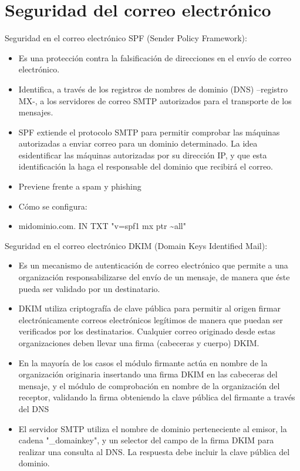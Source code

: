 \documentclass[aspectratio=169,11pt]{beamer}
\begin{document}
\section{Seguridad del correo electrónico}

\begin{frame}[allowframebreaks]{Seguridad en el correo electrónico}
\small
SPF (Sender Policy Framework):
  \begin{itemize}
  \item Es una protección contra la falsificación de direcciones en el envío de correo electrónico.
  \item Identifica, a través de los registros de nombres de dominio (DNS) --registro MX-, a los servidores de correo SMTP autorizados para el transporte de los mensajes.
  \item SPF extiende el protocolo SMTP para permitir comprobar las máquinas autorizadas a enviar correo para un dominio determinado. La idea esidentificar las máquinas autorizadas por su dirección IP, y que esta identificación la haga el responsable del dominio que recibirá el correo.
  \item Previene frente a spam y phishing
  \item Cómo se configura:
  \item midominio.com. IN TXT "v=spf1 mx ptr \textasciitilde{}all"
  \end{itemize}
\end{frame}

\begin{frame}{Seguridad en el correo electrónico}
\footnotesize
DKIM (Domain Keys Identified Mail):
  \begin{itemize}
  \item Es un mecanismo de autenticación de correo electrónico que permite a una organización responsabilizarse del envío de un mensaje, de manera que éste pueda ser validado por un destinatario.
  \item DKIM utiliza criptografía de clave pública para permitir al origen firmar electrónicamente correos electrónicos legítimos de manera que puedan ser verificados por los destinatarios. Cualquier correo originado desde estas organizaciones deben llevar una firma (cabeceras y cuerpo) DKIM.
  \item En la mayoría de los casos el módulo firmante actúa en nombre de la organización originaria insertando una firma DKIM en las cabeceras del mensaje, y el módulo de comprobación en nombre de la organización del receptor, validando la firma obteniendo la clave pública del firmante a través del DNS
  \item El servidor SMTP utiliza el nombre de dominio perteneciente al emisor, la cadena "\_domainkey", y un selector del campo de la firma DKIM para realizar una consulta al DNS. La respuesta debe incluir la clave pública del dominio.
  \end{itemize}
\end{frame}
\end{document}
